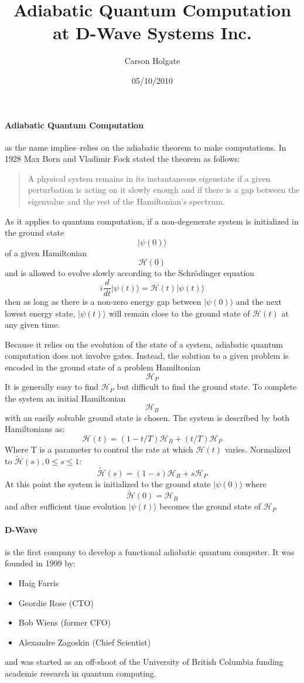 \documentclass[10pt]{article}
\author{Carson Holgate}
\title{Adiabatic Quantum Computation\\ at D-Wave Systems Inc.}
\date{05/10/2010}
\begin{document}
\maketitle

\paragraph{Adiabatic Quantum Computation}

as the name implies--relies on the adiabatic theorem to make computations. In 1928 Max Born and Vladimir Fock stated the theorem as follows: 
  \begin{quote}
   A physical system remains in its instantaneous eigenstate if a given perturbation is acting on it slowly enough and if there is a gap between the eigenvalue and the rest of the Hamiltonian's spectrum.
  \end{quote}
As it applies to quantum computation, if a non-degenerate system is initialized in the ground state 
  \[|\psi(0)\rangle\] 
of a given Hamiltonian 
  \[\mathcal{H}(0)\] 
and is allowed to evolve slowly according to the Schr\"{o}dinger equation 
  \[ i \frac{d}{dt} |\psi(t)\rangle = \mathcal{H}(t)|\psi(t)\rangle\] 
then as long as there is a non-zero energy gap between \(|\psi(0)\rangle\) and the next lowest energy state, \(|\psi(t)\rangle\) will remain close to the ground state of \(\mathcal{H}(t)\) at any given time.

Because it relies on the evolution of the state of a system, adiabatic quantum computation does not involve gates.   Instead, the solution to a given problem is encoded in the ground state of a problem Hamiltonian 
  \[\mathcal{H}_P\] 
It is generally easy to find \(\mathcal{H}_P\) but difficult to find the ground state. To complete the system an initial Hamiltonian 
  \[\mathcal{H}_B\] 
with an easily solvable ground state is chosen.  The system is described by both Hamiltonians as:  
  \[\mathcal{H}(t) = (1-t/T)\mathcal{H}_B + (t/T)\mathcal{H}_P\] 
Where T is a parameter to control the rate at which \(\mathcal{H}(t)\) varies.  Normalized to \(\tilde{\mathcal{H}}(s), 0 \leq s\leq 1\): 
  \[\tilde{\mathcal{H}}(s) = (1-s)\mathcal{H}_B + s\mathcal{H}_P\]
At this point the system is initialized to the ground state \(|\psi(0)\rangle\) where 
  \[\tilde{\mathcal{H}}(0) = \mathcal{H}_B\] 
and after sufficient time evolution \(|\psi(t)\rangle\) becomes the ground state of \(\mathcal{H}_P\)

\paragraph{D-Wave}
is the first company to develop a functional adiabatic quantum computer.  It was founded in 1999 by: 
  \begin{itemize}
   \item Haig Farris
   \item Geordie Rose (CTO)
   \item Bob Wiens (former CFO)
   \item Alexandre Zagoskin (Chief Scientist)
  \end{itemize}
and was started as an off-shoot of the University of British Columbia funding academic research in quantum computing.  
\end{document}

